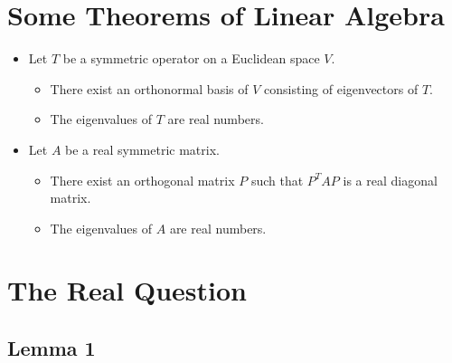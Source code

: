 \documentclass{beamer}
\begin{document}
      \section{Some Theorems of Linear Algebra}

            \begin{frame}
                  \begin{theorem}
                        \begin{itemize}
                              \item Let $T$ be a symmetric operator on a Euclidean space $V$.
                              \begin{itemize}
                                    \item There exist an orthonormal basis of $V$ consisting of eigenvectors of $T$.
                                    \item The eigenvalues of $T$ are real numbers.
                              \end{itemize}
                              \item Let $A$ be a real symmetric matrix.
                              \begin{itemize}
                                    \item There exist an orthogonal matrix $P$ such that $P^TAP$ is a real diagonal matrix.
                                    \item The eigenvalues of $A$ are real numbers.
                              \end{itemize}
                        \end{itemize}
                  \end{theorem}
            \end{frame}

      \section{The Real Question}

            \subsection{Lemma 1}
\end{document}
